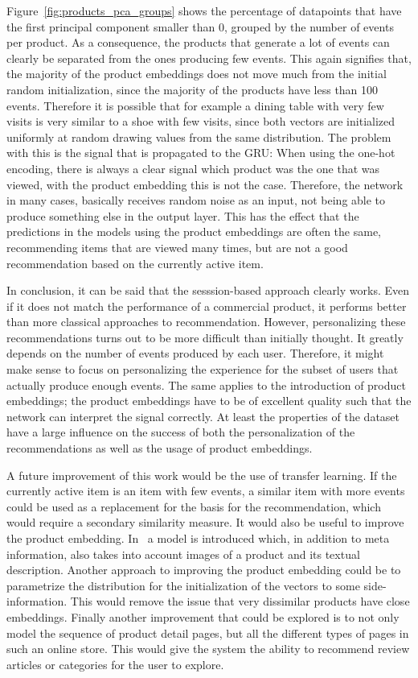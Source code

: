 Figure~\ref{fig:products_pca_groups} shows the percentage of datapoints that have the first principal component smaller than 0, grouped by the number of events per product.
As a consequence, the products that generate a lot of events can clearly be separated from the ones producing few events.
This again signifies that, the majority of the product embeddings does not move much from the initial random initialization, since the majority of the products have less than 100 events.
Therefore it is possible that for example a dining table with very few visits is very similar to a shoe with few visits, since both vectors are initialized uniformly at random drawing values from the same distribution.
The problem with this is the signal that is propagated to the GRU:
When using the one-hot encoding, there is always a clear signal which product was the one that was viewed, with the product embedding this is not the case.
Therefore, the network in many cases, basically receives random noise as an input, not being able to produce something else in the output layer.
This has the effect that the predictions in the models using the product embeddings are often the same, recommending items that are viewed many times, but are not a good recommendation based on the currently active item.
\par
In conclusion, it can be said that the sesssion-based approach clearly works.
Even if it does not match the performance of a commercial product, it performs better than more classical approaches to recommendation.
However, personalizing these recommendations turns out to be more difficult than initially thought.
It greatly depends on the number of events produced by each user.
Therefore, it might make sense to focus on personalizing the experience for the subset of users that actually produce enough events.
The same applies to the introduction of product embeddings; the product embeddings have to be of excellent quality such that the network can interpret the signal correctly.
At least the properties of the dataset have a large influence on the success of both the personalization of the recommendations as well as the usage of product embeddings.
\par
A future improvement of this work would be the use of transfer learning.
If the currently active item is an item with few events, a similar item with more events could be used as a replacement for the basis for the recommendation, which would require a secondary similarity measure.
It would also be useful to improve the product embedding.
In~\cite{content2vec} a model is introduced which, in addition to meta information, also takes into account images of a product and its textual description.
Another approach to improving the product embedding could be to parametrize the distribution for the initialization of the vectors to some side-information.
This would remove the issue that very dissimilar products have close embeddings.
Finally another improvement that could be explored is to not only model the sequence of product detail pages, but all the different types of pages in such an online store.
This would give the system the ability to recommend review articles or categories for the user to explore.